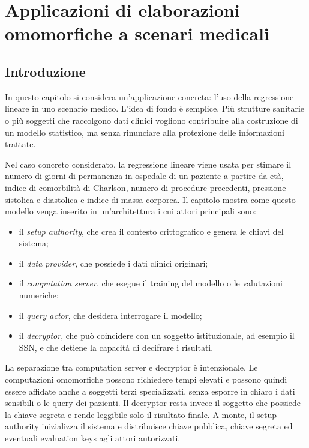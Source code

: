 \chapter{Applicazioni di elaborazioni omomorfiche a scenari medicali}

\section{Introduzione}
In questo capitolo si considera un'applicazione concreta: l'uso della regressione lineare in uno scenario medico. L'idea di fondo \`e semplice. Pi\`u strutture sanitarie o pi\`u soggetti che raccolgono dati clinici vogliono contribuire alla costruzione di un modello statistico, ma senza rinunciare alla protezione delle informazioni trattate.

Nel caso concreto considerato, la regressione lineare viene usata per stimare il numero di giorni di permanenza in ospedale di un paziente a partire da et\`a, indice di comorbilit\`a di Charlson, numero di procedure precedenti, pressione sistolica e diastolica e indice di massa corporea. Il capitolo mostra come questo modello venga inserito in un'architettura i cui attori principali sono:
\begin{itemize}
  \item il \emph{setup authority}, che crea il contesto crittografico e genera le chiavi del sistema;
  \item il \emph{data provider}, che possiede i dati clinici originari;
  \item il \emph{computation server}, che esegue il training del modello o le valutazioni numeriche;
  \item il \emph{query actor}, che desidera interrogare il modello;
  \item il \emph{decryptor}, che pu\`o coincidere con un soggetto istituzionale, ad esempio il SSN, e che detiene la capacit\`a di decifrare i risultati.
\end{itemize}

La separazione tra computation server e decryptor \`e intenzionale. Le computazioni omomorfiche possono richiedere tempi elevati e possono quindi essere affidate anche a soggetti terzi specializzati, senza esporre in chiaro i dati sensibili o le query dei pazienti. Il decryptor resta invece il soggetto che possiede la chiave segreta e rende leggibile solo il risultato finale. A monte, il setup authority inizializza il sistema e distribuisce chiave pubblica, chiave segreta ed eventuali evaluation keys agli attori autorizzati.

